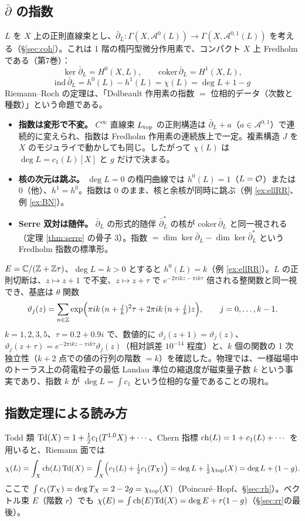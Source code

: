 \subsection{$\bar\partial$ の指数}
$L$ を $X$ 上の正則直線束とし、$\bar\partial_L:\Gamma(X,\mathcal A^0(L))\to\Gamma(X,\mathcal A^{0,1}(L))$ を考える（\S\ref{sec:coh}）。これは 1 階の楕円型微分作用素で、コンパクト $X$ 上 Fredholm である（第7巻）：
\[
\ker\bar\partial_L=H^0(X,L),\qquad\mathrm{coker}\,\bar\partial_L=H^1(X,L),
\]
\[
\boxed{\ \mathrm{ind}\,\bar\partial_L=h^0(L)-h^1(L)=\chi(L)=\deg L+1-g\ }
\]
Riemann--Roch の定理は、「Dolbeault 作用素の指数 $=$ 位相的データ（次数と種数）」という命題である。
\begin{itemize}
\item \textbf{指数は変形で不変。} $C^\infty$ 直線束 $L_{\rm top}$ の正則構造は $\bar\partial_L+a$（$a\in\mathcal A^{0,1}$）で連続的に変えられ、指数は Fredholm 作用素の連続族上で一定。複素構造 $J$ を $X$ のモジュライで動かしても同じ。したがって $\chi(L)$ は $\deg L=c_1(L)[X]$ と $g$ だけで決まる。
\item \textbf{核の次元は跳ぶ。} $\deg L=0$ の楕円曲線では $h^0(L)=1$（$L=\mathcal O$）または $0$（他）、$h^1=h^0$。指数は $0$ のまま、核と余核が同時に跳ぶ（例 \ref{ex:ellRR}、例 \ref{ex:BN}）。
\item \textbf{Serre 双対は随伴。} $\bar\partial_L$ の形式的随伴 $\bar\partial_L^*$ の核が $\mathrm{coker}\,\bar\partial_L$ と同一視される（定理 \ref{thm:serre} の骨子 3）。指数 $=\dim\ker\bar\partial_L-\dim\ker\bar\partial_L^*$ という Fredholm 指数の標準形。
\end{itemize}
\begin{ex}\label{ex:landau}
$E=\mathbb C/(\mathbb Z+\mathbb Z\tau)$、$\deg L=k>0$ とすると $h^0(L)=k$（例 \ref{ex:ellRR}）。$L$ の正則切断は、$z\mapsto z+1$ で不変、$z\mapsto z+\tau$ で $e^{-2\pi ikz-\pi ik\tau}$ 倍される整関数と同一視でき、基底は $\theta$ 関数
\[
\vartheta_j(z)=\sum_{n\in\mathbb Z}\exp\Bigl(\pi ik\,(n+\tfrac jk)^2\tau+2\pi ik\,(n+\tfrac jk)z\Bigr),\qquad j=0,\dots,k-1.
\]
$k=1,2,3,5$、$\tau=0.2+0.9i$ で、数値的に $\vartheta_j(z+1)=\vartheta_j(z)$、$\vartheta_j(z+\tau)=e^{-2\pi ikz-\pi ik\tau}\vartheta_j(z)$（相対誤差 $10^{-14}$ 程度）と、$k$ 個の関数の 1 次独立性（$k+2$ 点での値の行列の階数 $=k$）を確認した。物理では、一様磁場中のトーラス上の荷電粒子の最低 Landau 準位の縮退度が磁束量子数 $k$ という事実であり、指数 $k$ が $\deg L=\int c_1$ という位相的な量であることの現れ。
\end{ex}

\subsection{指数定理による読み方}
Todd 類 $\mathrm{Td}(X)=1+\tfrac12c_1(T^{1,0}X)+\cdots$、Chern 指標 $\mathrm{ch}(L)=1+c_1(L)+\cdots$ を用いると、Riemann 面では
\[
\chi(L)=\int_X\mathrm{ch}(L)\,\mathrm{Td}(X)=\int_X\Bigl(c_1(L)+\tfrac12c_1(T_X)\Bigr)=\deg L+\tfrac12\chi_{\rm top}(X)=\deg L+(1-g).
\]
ここで $\int c_1(T_X)=\deg T_X=2-2g=\chi_{\rm top}(X)$（Poincaré--Hopf、§\ref{sec:rh}）。ベクトル束 $E$（階数 $r$）でも $\chi(E)=\int\mathrm{ch}(E)\mathrm{Td}(X)=\deg E+r(1-g)$（\S\ref{sec:rr}の最後）。

